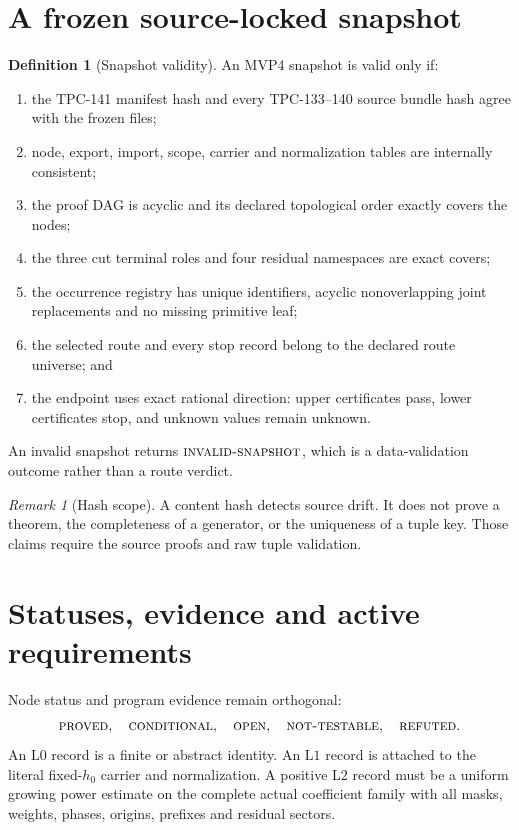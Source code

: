 \documentclass[11pt]{article}
\theoremstyle{definition}
\newtheorem{definition}[theorem]{Definition}
\theoremstyle{remark}
\newtheorem{remark}[theorem]{Remark}
\newcommand{\NT}{\textnormal{\textsc{not-testable}}}
\newcommand{\OPEN}{\textnormal{\textsc{open}}}
\newcommand{\INVALID}{\textnormal{\textsc{invalid-snapshot}}}
\newcommand{\PROVED}{\textnormal{\textsc{proved}}}
\newcommand{\COND}{\textnormal{\textsc{conditional}}}
\newcommand{\REFUTED}{\textnormal{\textsc{refuted}}}
\newcommand{\Lzero}{\mathrm{L0}}
\newcommand{\Lone}{\mathrm{L1}}
\newcommand{\Ltwo}{\mathrm{L2}}
\begin{document}
\section{A frozen source-locked snapshot}

\begin{definition}[Snapshot validity]
\label{def:valid}
An MVP4 snapshot is valid only if:
\begin{enumerate}[label=(\roman*),leftmargin=2.2em]
\item the TPC-141 manifest hash and every TPC-133--140 source bundle
  hash agree with the frozen files;
\item node, export, import, scope, carrier and normalization tables
  are internally consistent;
\item the proof DAG is acyclic and its declared topological order
  exactly covers the nodes;
\item the three cut terminal roles and four residual namespaces are
  exact covers;
\item the occurrence registry has unique identifiers, acyclic
  nonoverlapping joint replacements and no missing primitive leaf;
\item the selected route and every stop record belong to the declared
  route universe; and
\item the endpoint uses exact rational direction: upper certificates
  pass, lower certificates stop, and unknown values remain unknown.
\end{enumerate}
An invalid snapshot returns \(\INVALID\), which is a data-validation
outcome rather than a route verdict.
\end{definition}

\begin{remark}[Hash scope]
A content hash detects source drift.  It does not prove a theorem,
the completeness of a generator, or the uniqueness of a tuple key.
Those claims require the source proofs and raw tuple validation.
\end{remark}

\section{Statuses, evidence and active requirements}

Node status and program evidence remain orthogonal:
\[
\PROVED,\quad \COND,\quad \OPEN,\quad \NT,\quad \REFUTED.
\]
An \(\Lzero\) record is a finite or abstract identity.  An
\(\Lone\) record is attached to the literal fixed-\(h_0\) carrier and
normalization.  A positive \(\Ltwo\) record must be a uniform growing
power estimate on the complete actual coefficient family with all
masks, weights, phases, origins, prefixes and residual sectors.
\end{document}

